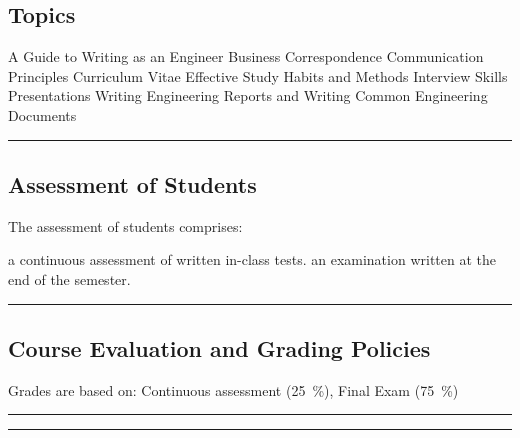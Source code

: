 \subsection*{Topics}
\begin{outline}
    \1 A Guide to Writing as an Engineer
    \1 Business Correspondence
    \1 Communication Principles
    \1 Curriculum Vitae
    \1 Effective Study Habits and Methods
    \1 Interview Skills
    \1 Presentations
    \1 Writing Engineering Reports and Writing Common Engineering Documents
\end{outline}
\vspace{2ex} \hrule\vspace{2ex}

\subsection*{Assessment of Students}
The assessment of students comprises:
\begin{outline}
    \1 a continuous assessment of written in-class tests.
    \1 an examination written at the end of the semester.
\end{outline}
\vspace{2ex}\hrule\vspace{2ex}

\subsection*{Course Evaluation and Grading Policies}
Grades are based on:
Continuous assessment (\qty{25}{\percent}),
Final Exam (\qty{75}{\percent})
\vspace{2ex}\hrule
\vspace{2ex}\hrule\vspace{2ex}



